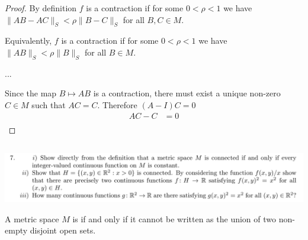\documentclass[12pt]{article}
\begin{document}
\begin{enumerate}
\begin{proof}
    By definition $f$ is a contraction if for some $0 < \rho < 1$ we have
    $\|AB - AC\|_S < \rho\|B - C\|_S$ for all $B, C \in M$.

    Equivalently, $f$ is a contraction if for some $0 < \rho < 1$ we have $\|AB\|_S < \rho\|B\|_S$
    for all $B \in M$.

    ...

    Since the map $B \mapsto AB$ is a contraction, there must exist a unique non-zero $C \in M$
    such that $AC = C$. Therefore $(A - I)C = 0$
    \begin{align*}
      AC - C   &= 0\\

    \end{align*}

  \end{proof}
\end{enumerate}

\subsection{}


\begin{mdframed}
\includegraphics[width=400pt]{img/oxford-a2-2-7.png}
\end{mdframed}

\begin{definition*}
  A metric space $M$ is  if and only if it cannot be written as the union of two
  non-empty disjoint open sets.
\end{definition*}
\end{document}
